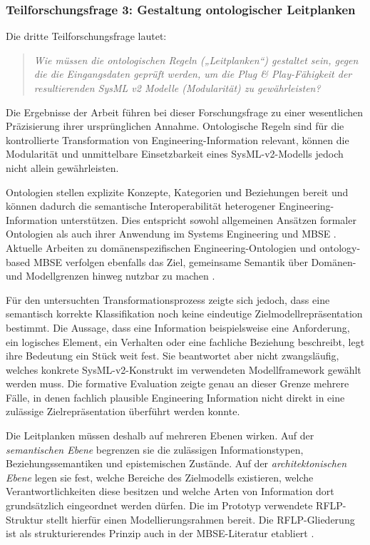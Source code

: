 \subsubsection{Teilforschungsfrage 3: Gestaltung ontologischer Leitplanken}
\label{sec:discussion_rq3}

Die dritte Teilforschungsfrage lautet:

\begin{quote}
\textit{Wie müssen die ontologischen Regeln („Leitplanken“) gestaltet sein,
gegen die die Eingangsdaten geprüft werden, um die Plug \& Play-Fähigkeit der
resultierenden SysML v2 Modelle (Modularität) zu gewährleisten?}
\end{quote}

Die Ergebnisse der Arbeit führen bei dieser Forschungsfrage zu einer
wesentlichen Präzisierung ihrer ursprünglichen Annahme. Ontologische Regeln
sind für die kontrollierte Transformation von Engineering-Information
relevant, können die Modularität und unmittelbare Einsetzbarkeit eines
SysML-v2-Modells jedoch nicht allein gewährleisten.

Ontologien stellen explizite Konzepte, Kategorien und Beziehungen bereit und
können dadurch die semantische Interoperabilität heterogener
Engineering-Information unterstützen. Dies entspricht sowohl allgemeinen
Ansätzen formaler Ontologien als auch ihrer Anwendung im Systems Engineering
und MBSE \cite{ISO21838_2_2021,OrellanaMandrick2019,Lu2022}.
Aktuelle Arbeiten zu domänenspezifischen Engineering-Ontologien und
ontology-based MBSE verfolgen ebenfalls das Ziel, gemeinsame Semantik über
Domänen- und Modellgrenzen hinweg nutzbar zu machen
\cite{Liu2025SysDO,Dong2026,Kulvatunyou2022}.

Für den untersuchten Transformationsprozess zeigte sich jedoch, dass eine
semantisch korrekte Klassifikation noch keine eindeutige
Zielmodellrepräsentation bestimmt. Die Aussage, dass eine Information
beispielsweise eine Anforderung, ein logisches Element, ein Verhalten oder
eine fachliche Beziehung beschreibt, legt ihre Bedeutung ein Stück weit fest.
Sie beantwortet aber nicht zwangsläufig, welches konkrete SysML-v2-Konstrukt
im verwendeten Modellframework gewählt werden muss. Die formative Evaluation
zeigte genau an dieser Grenze mehrere Fälle, in denen fachlich plausible
Engineering Information nicht direkt in eine zulässige Zielrepräsentation
überführt werden konnte.

Die Leitplanken müssen deshalb auf mehreren Ebenen wirken. Auf der
\emph{semantischen Ebene} begrenzen sie die zulässigen Informationstypen,
Beziehungssemantiken und epistemischen Zustände. Auf der
\emph{architektonischen Ebene} legen sie fest, welche Bereiche des
Zielmodells existieren, welche Verantwortlichkeiten diese besitzen und welche
Arten von Information dort grundsätzlich eingeordnet werden dürfen. 
Die im Prototyp verwendete RFLP-Struktur stellt hierfür einen
Modellierungsrahmen bereit. Die RFLP-Gliederung ist als strukturierendes
Prinzip auch in der MBSE-Literatur etabliert
\cite{LiLockettLawson2020}.

